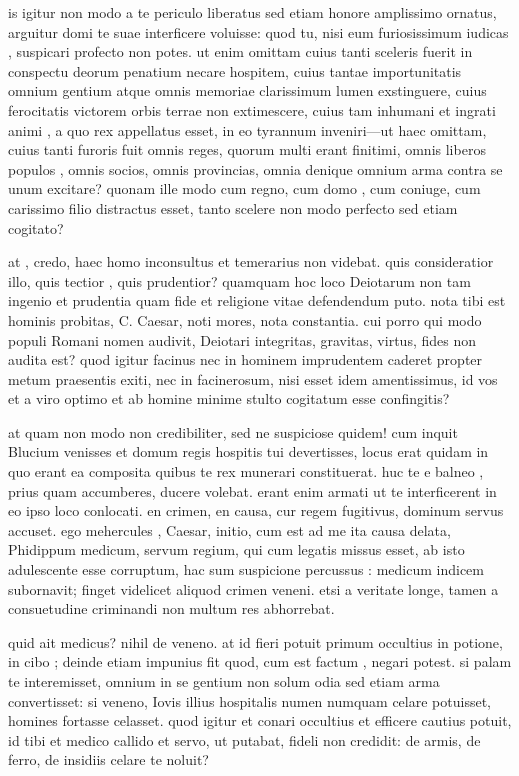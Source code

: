  is igitur non modo a te periculo liberatus sed etiam honore amplissimo ornatus, arguitur domi te suae interficere voluisse: quod tu, nisi eum furiosissimum iudicas , suspicari profecto non potes. ut enim omittam cuius tanti sceleris fuerit in conspectu deorum penatium necare hospitem, cuius tantae importunitatis omnium gentium atque omnis memoriae clarissimum lumen exstinguere, cuius ferocitatis victorem orbis terrae non extimescere, cuius tam inhumani et ingrati animi , a quo rex appellatus esset, in eo tyrannum inveniri—ut haec omittam, cuius tanti furoris fuit omnis reges, quorum multi erant finitimi, omnis liberos populos , omnis socios, omnis provincias, omnia denique omnium arma contra se unum excitare? quonam ille modo cum regno, cum domo , cum coniuge, cum carissimo filio distractus esset, tanto scelere non modo perfecto sed etiam cogitato?

 at , credo, haec homo inconsultus et temerarius non videbat. quis consideratior illo, quis tectior , quis prudentior? quamquam hoc loco Deiotarum non tam ingenio et prudentia quam fide et religione vitae defendendum puto. nota tibi est hominis probitas, C. Caesar, noti mores, nota constantia. cui porro qui modo populi Romani nomen audivit, Deiotari integritas, gravitas, virtus, fides non audita est? quod igitur facinus nec in hominem imprudentem caderet propter metum praesentis exiti, nec in facinerosum, nisi esset idem amentissimus, id vos et a viro optimo et ab homine minime stulto cogitatum esse confingitis?

 at quam non modo non credibiliter, sed ne suspiciose quidem! cum inquit Blucium venisses et domum regis hospitis tui devertisses, locus erat quidam in quo erant ea composita quibus te rex munerari constituerat. huc te e balneo , prius quam accumberes, ducere volebat. erant enim armati ut te interficerent in eo ipso loco conlocati. en crimen, en causa, cur regem fugitivus, dominum servus accuset. ego mehercules , Caesar, initio, cum est ad me ita causa delata, Phidippum medicum, servum regium, qui cum legatis missus esset, ab isto adulescente esse corruptum, hac sum suspicione percussus : medicum indicem subornavit; finget videlicet aliquod crimen veneni. etsi a veritate longe, tamen a consuetudine criminandi non multum res abhorrebat.

 quid ait medicus? nihil de veneno. at id fieri potuit primum occultius in potione, in cibo ; deinde etiam impunius fit quod, cum est factum , negari potest. si palam te interemisset, omnium in se gentium non solum odia sed etiam arma convertisset: si veneno, Iovis illius hospitalis numen numquam celare potuisset, homines fortasse celasset. quod igitur et conari occultius et efficere cautius potuit, id tibi et medico callido et servo, ut putabat, fideli non credidit: de armis, de ferro, de insidiis celare te noluit?

